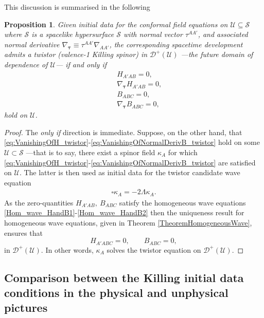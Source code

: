 \documentclass[10pt,a4paper]{article}
\theoremstyle{plain}
\newtheorem{proposition}{Proposition}
\begin{document}
This discussion is summarised in the following
\begin{proposition}\label{Prop:Propagation_twistor}
  Given initial data for the conformal field equations on $\mathcal{U}\subseteq\mathcal{S}$
  where $\mathcal{S}$ is a spacelike
hypersurface $\mathcal{S}$ with normal vector $\tau^{AA'}$, and
associated normal derivative $\nabla_{\bm\tau} \equiv
\tau^{AA'}\nabla_{AA'}$, the corresponding spacetime development
admits a twistor (valence-1 Killing spinor) in $\mathcal{D}^{+}(\mathcal{U})$ ---the future domain of dependence of $\mathcal{U}$---  if and only if
\begin{subequations}
\begin{eqnarray}
  && H_{A'AB}=0,\label{eq:VanishingOfH_twistor}\\ && \nabla_{\bm\tau}
  H_{A'AB}=0,\label{eq:VanishingOfNormalDerivH_twistor}\\ &&
  B_{ABC}=0,\label{eq:VanishingOfB_twistor}\\ &&\nabla_{\bm\tau}
  B_{ABC}=0, \label{eq:VanishingOfNormalDerivB_twistor}
\end{eqnarray}
\end{subequations}
 hold on $\mathcal{U}$.
\end{proposition}
\begin{proof}
The \emph{only if} direction is immediate. Suppose, on the other hand,
that
\eqref{eq:VanishingOfH_twistor}-\eqref{eq:VanishingOfNormalDerivB_twistor}
hold on some $\mathcal{U}\subset\mathcal{S}$ ---that is to say, there
exist a spinor field $\kappa_{A}$ for which
\eqref{eq:VanishingOfH_twistor}-\eqref{eq:VanishingOfNormalDerivB_twistor}
are satisfied on $\mathcal{U}$. The latter is then used as initial
data for the twistor candidate wave equation
\begin{align} \label{Wave_eq_twistor_candidate_prop}
\square \kappa _{A} = -2 \Lambda \kappa _{A}.
\end{align}
As the zero-quantities $H_{A'AB},~B_{ABC}$ satisfy the homogeneous
wave equations \eqref{Hom_wave_HandB1}-\eqref{Hom_wave_HandB2} then
the uniqueness result for homogeneous wave equations, given in
Theorem \ref{TheoremHomogeneousWave},
ensures that
\[ H_{A'ABC}=0,\qquad B_{ABC}=0,\]
in $\mathcal{D}^{+}(\mathcal{U})$. In other words,
$\kappa_{A}$ solves the twistor equation on $\mathcal{D}^{+}(\mathcal{U})$.
\end{proof}


\subsection{Comparison between the Killing initial data conditions
  in the physical and unphysical pictures}
\end{document}
